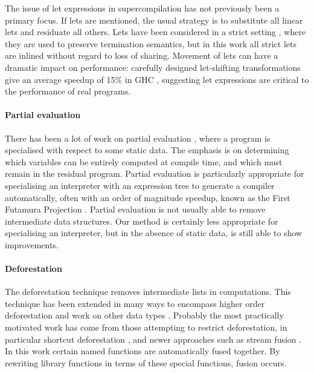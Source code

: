 The issue of let expressions in supercompilation has not previously been a primary focus. If lets are mentioned, the usual strategy is to substitute all linear lets and residuate all others. Lets have been considered in a strict setting \cite{jonsson:supercompilation}, where they are used to preserve termination semantics, but in this work all strict lets are inlined without regard to loss of sharing. Movement of lets can have a dramatic impact on performance: carefully designed let-shifting transformations give an average speedup of 15\% in GHC \cite{spj:letfloating}, suggesting let expressions are critical to the performance of real programs.

\paragraph{Partial evaluation} There has been a lot of work on partial evaluation \cite{jones:partial_evaluation}, where a program is specialised with respect to some static data. The emphasis is on determining which variables can be entirely computed at compile time, and which must remain in the residual program. Partial evaluation is particularly appropriate for specialising an interpreter with an expression tree to generate a compiler automatically, often with an order of magnitude speedup, known as the First Futamura Projection \cite{futanama:projections}. Partial evaluation is not usually able to remove intermediate data structures. Our method is certainly less appropriate for specialising an interpreter, but in the absence of static data, is still able to show improvements.


\paragraph{Deforestation} The deforestation technique \cite{wadler:deforestation} removes intermediate lists in computations. This technique has been extended in many ways to encompass higher order deforestation \cite{marlow:higher_order_deforestation} and work on other data types \cite{coutts:string_fusion}. Probably the most practically motivated work has come from those attempting to restrict deforestation, in particular shortcut deforestation \cite{gill:shortcut_deforestation}, and newer approaches such as stream fusion \cite{coutts:stream_fusion}. In this work certain named functions are automatically fused together. By rewriting library functions in terms of these special functions, fusion occurs.

